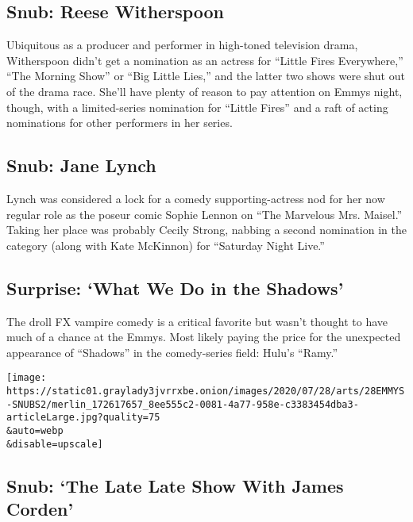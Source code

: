 \hypertarget{snub-reese-witherspoon}{%
\subsection{Snub: Reese Witherspoon}\label{snub-reese-witherspoon}}

Ubiquitous as a producer and performer in high-toned television drama,
Witherspoon didn't get a nomination as an actress for ``Little Fires
Everywhere,'' ``The Morning Show'' or ``Big Little Lies,'' and the
latter two shows were shut out of the drama race. She'll have plenty of
reason to pay attention on Emmys night, though, with a limited-series
nomination for ``Little Fires'' and a raft of acting nominations for
other performers in her series.

\hypertarget{snub-jane-lynch}{%
\subsection{Snub: Jane Lynch}\label{snub-jane-lynch}}

Lynch was considered a lock for a comedy supporting-actress nod for her
now regular role as the poseur comic Sophie Lennon on ``The Marvelous
Mrs. Maisel.'' Taking her place was probably Cecily Strong, nabbing a
second nomination in the category (along with Kate McKinnon) for
``Saturday Night Live.''

\hypertarget{surprise-what-we-do-in-the-shadows}{%
\subsection{Surprise: `What We Do in the
Shadows'}\label{surprise-what-we-do-in-the-shadows}}

The droll FX vampire comedy is a critical favorite but wasn't thought to
have much of a chance at the Emmys. Most likely paying the price for the
unexpected appearance of ``Shadows'' in the comedy-series field: Hulu's
``Ramy.''

\texttt{[image: https://static01.graylady3jvrrxbe.onion/images/2020/07/28/arts/28EMMYS-SNUBS2/merlin\_172617657\_8ee555c2-0081-4a77-958e-c3383454dba3-articleLarge.jpg?quality=75\\\&auto=webp\\\&disable=upscale]}

\hypertarget{snub-the-late-late-show-with-james-corden}{%
\subsection{Snub: `The Late Late Show With James
Corden'}\label{snub-the-late-late-show-with-james-corden}}


